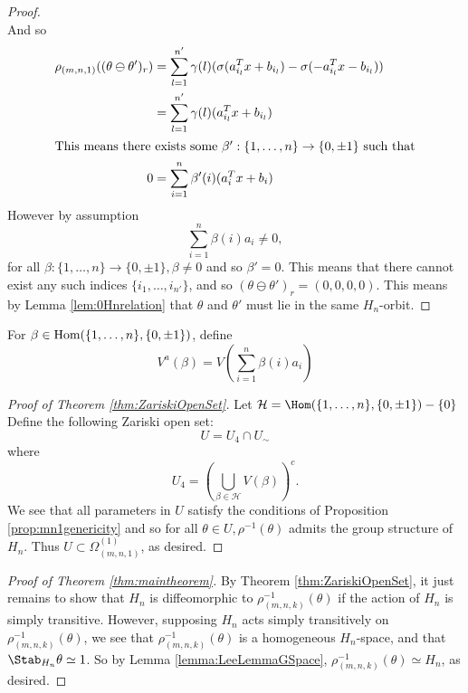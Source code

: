 \documentclass[11pt,letterpaper]{amsart}
\begin{document}
\begin{proof}
$$    $$
    And so
    \begin{align*}
        \rho_{(m,n,1)}((\theta\ominus \theta')_r) &= \sum_{l=1}^{n'} \gamma(l)(\sigma(a_{i_l}^Tx+b_{i_l}) - \sigma(-a_{i_l}^Tx-b_{i_l}))\\
        &= \sum_{l=1}^{n'} \gamma(l)(a_{i_l}^Tx+b_{i_l})\\
        \intertext{This means there exists some $\beta':\{1, \ldots, n\}\rightarrow \{0, \pm 1\}$ such that}
       0 &= \sum_{i=1}^n \beta'(i)(a_{i}^Tx+b_{i})
    \end{align*}
    However by assumption
    $$
    \sum_{i=1}^n \beta(i) a_{i} \neq 0,
    $$
    for all $\beta:\{1, \ldots, n\}\rightarrow \{0, \pm 1\}, \beta\neq 0$ and so $\beta' =0$. This means that there cannot exist any such indices $\{i_1, \ldots, i_{n'}\}$, and so $(\theta\ominus\theta')_r=(0,0,0,0)$. This means by Lemma \ref{lem:0Hnrelation} that $\theta$ and $\theta'$ must lie in the same $H_n$-orbit.
\end{proof}
\begin{defin}
    For $\beta\in \textup{Hom}(\{1, \ldots, n\}, \{0, \pm 1\})$, define
    $$
    V^a(\beta) = V\left(\sum_{i=1}^n \beta(i)a_i\right)
    $$
\end{defin}
\begin{proof}[Proof of Theorem \ref{thm:ZariskiOpenSet}]
    Let $\mathcal{H}=\Hom(\{1, \ldots, n\}, \{0,\pm 1\})-\{0\}$ Define the following Zariski open set:
    $$
    U = U_4 \cap U_\sim
    $$
    where 
    $$
    U_4 = \left(\bigcup_{\beta\in\mathcal{H}}V(\beta)\right)^c.
    $$
    We see that all parameters in $U$ satisfy the conditions of Proposition \ref{prop:mn1genericity} and so for all $\theta\in U, \rho^{-1}(\theta)$ admits the group structure of $H_n$. Thus $U\subset \Omega_{(m,n,1)}^{(1)}$, as desired.
\end{proof}
\begin{proof}[Proof of Theorem \ref{thm:maintheorem}]
    By Theorem \ref{thm:ZariskiOpenSet}, it just remains to show that $H_n$ is diffeomorphic to $\rho^{-1}_{(m,n,k)}(\theta)$ if the action of $H_n$ is simply transitive. However, supposing $H_n$ acts simply transitively on $\rho^{-1}_{(m,n,k)}(\theta)$, we see that $\rho^{-1}_{(m,n,k)}(\theta)$ is a homogeneous $H_n$-space, and that $\Stab_{H_n}\theta\simeq 1$. So by Lemma \ref{lemma:LeeLemmaGSpace}, $\rho^{-1}_{(m,n,k)}(\theta)\simeq H_n$, as desired.
\end{proof}
\end{document}
